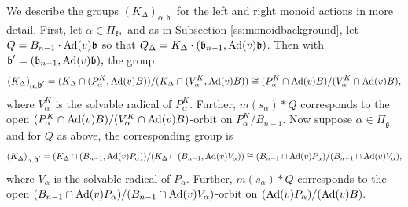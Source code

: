 \documentclass[12pt]{amsart}
\numberwithin{equation}{section}
\newcommand{\fk}{\mbox{${\mathfrak k}$}}
\newcommand{\fg}{\mbox{${\mathfrak g}$}}
\newcommand{\fl}{\mbox{${\mathfrak l}$}}
\newcommand{\fs}{\mbox{${\mathfrak s}$}}
\newcommand{\fsl}{\mbox{${\fs\fl}$}}
\newcommand{\fb}{\mbox{${\mathfrak b}$}}
\newcommand{\Ad}{{\rm Ad}}
\newcommand{\B}{\mathcal{B}}
\newcommand{\ms}{m(s_{\alpha})}
\begin{document}
We describe the groups $(K_{\Delta})_{\alpha, \fb^{\prime}}$ for the left and right monoid actions in more detail.   First, let $\alpha \in \Pi_{\fk},$  
and as in Subsection \ref{ss:monoidbackground}, let $Q=B_{n-1}\cdot\Ad(v)\fb$ so that $Q_{\Delta}=K_{\Delta}\cdot(\fb_{n-1},\Ad(v)\fb)$.  Then with $\fb^{\prime}=(\fb_{n-1},\Ad(v)\fb),$ the group
\begin{equation}\label{eq:localKkroot}
(K_{\Delta})_{\alpha, \fb^{\prime}}=(K_{\Delta}\cap (P^{K}_{\alpha},\Ad(v)B))/(K_{\Delta}\cap(V_{\alpha}^{K}, \Ad(v)B))
\cong (P^{K}_{\alpha} \cap \Ad(v)B)/(V^{K}_{\alpha} \cap \Ad(v)B),
\end{equation}
where $V_{\alpha}^{K}$ is the solvable radical of $P_{\alpha}^{K}$.  %
 Further, $m(s_{\alpha})*Q$ corresponds to the open $(P^{K}_{\alpha} \cap \Ad(v)B)/(V^{K}_{\alpha} \cap \Ad(v)B)$-orbit on $P_{\alpha}^K/B_{n-1}.$  Now suppose $\alpha \in \Pi_{\fg}$ and for $Q$ as above, the corresponding group is
\begin{equation}\label{eq:localKgroot}
(K_{\Delta})_{\alpha, \fb^{\prime}}=(K_{\Delta}\cap (B_{n-1},\Ad(v)P_{\alpha}))/(K_{\Delta} \cap(B_{n-1},\Ad(v)V_{\alpha}) ) \cong (B_{n-1}\cap \Ad(v)P_{\alpha})/(B_{n-1}\cap \Ad(v)V_{\alpha}),
\end{equation}
where $V_{\alpha}$ is the solvable radical of $P_{\alpha}.$
%
Further, $m(s_{\alpha})*Q$ corresponds to the open $(B_{n-1}\cap \Ad(v)P_{\alpha})/(B_{n-1}\cap \Ad(v)V_{\alpha})$-orbit on $(\Ad(v)P_{\alpha})/(\Ad(v)B).$
\end{document}
